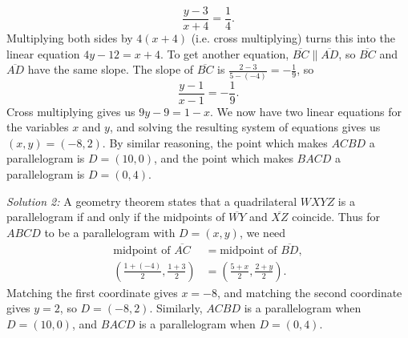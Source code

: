\begin{enumerate}
\begin{equation*}
\frac{y - 3}{x + 4} = \frac{1}{4}.
\end{equation*}
Multiplying both sides by $4(x + 4)$ (i.e. cross multiplying) turns this into the linear equation $4y - 12 = x + 4$. To get another equation, $\overline{BC}\parallel\overline{AD}$, so $\overline{BC}$ and $\overline{AD}$ have the same slope. The slope of $\overline{BC}$ is $\frac{2 - 3}{5 - (-4)} = -\frac{1}{9}$, so 
\begin{equation*}
\frac{y - 1}{x - 1} = -\frac{1}{9}.
\end{equation*}
Cross multiplying gives us $9y - 9 = 1 - x$. We now have two linear equations for the variables $x$ and $y$, and solving the resulting system of equations gives us $(x,y) = \boxed{(-8,2)}$. By similar reasoning, the point which makes $ACBD$ a parallelogram is $D = \boxed{(10,0)}$, and the point which makes $BACD$ a parallelogram is $D = \boxed{(0,4)}$.\par 
\emph{Solution 2:} A geometry theorem states that a quadrilateral $WXYZ$ is a parallelogram if and only if the midpoints of $\overline{WY}$ and $\overline{XZ}$ coincide. Thus for $ABCD$ to be a parallelogram with $D = (x,y)$, we need
\begin{align*}
\text{midpoint of }\overline{AC} &= \text{midpoint of }\overline{BD}, \\
\left(\frac{1 + (-4)}{2}, \frac{1 + 3}{2}\right) &= \left(\frac{5 + x}{2}, \frac{2 + y}{2}\right).
\end{align*}
Matching the first coordinate gives $x = -8$, and matching the second coordinate gives $y = 2$, so $D = \boxed{(-8,2)}$. Similarly, $ACBD$ is a parallelogram when $D = \boxed{(10,0)}$, and $BACD$ is a parallelogram when $D = \boxed{(0,4)}$.
\end{enumerate}